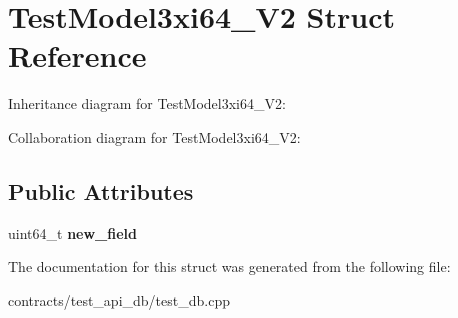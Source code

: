 \hypertarget{struct_test_model3xi64___v2}{}\section{Test\+Model3xi64\+\_\+\+V2 Struct Reference}
\label{struct_test_model3xi64___v2}


Inheritance diagram for Test\+Model3xi64\+\_\+\+V2\+:


Collaboration diagram for Test\+Model3xi64\+\_\+\+V2\+:
\subsection*{Public Attributes}
\begin{DoxyCompactItemize}
\item 
\mbox{\label{struct_test_model3xi64___v2_a014b817a26e4fd92768f21b286d944b7}} 
uint64\+\_\+t {\bfseries new\+\_\+field}
\end{DoxyCompactItemize}


The documentation for this struct was generated from the following file\+:\begin{DoxyCompactItemize}
\item 
contracts/test\+\_\+api\+\_\+db/test\+\_\+db.\+cpp\end{DoxyCompactItemize}
